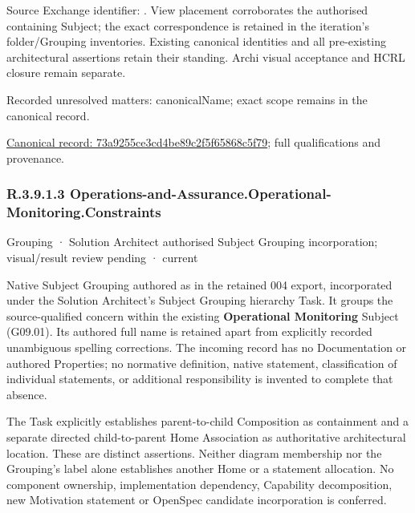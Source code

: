 Source Exchange identifier: \texttt{}. View placement corroborates
the authorised containing Subject; the exact correspondence is retained in the
iteration's folder/Grouping inventories. Existing canonical identities and all
pre-existing architectural assertions retain their standing. Archi visual
acceptance and HCRL closure remain separate.


{\small Recorded unresolved matters: canonicalName; exact scope remains in the canonical record.}\par
{\footnotesize \href{../../../../continuum/grouping/73a9255ce3cd4be89c2f5f65868c5f79.md}{Canonical record: 73a9255ce3cd4be89c2f5f65868c5f79}; full qualifications and provenance.}\par
\subsubsection*{R.3.9.1.3 Operations-and-Assurance.Operational-Monitoring.Constraints}
\label{navigation:R.3.9.1.3}

\label{element:b558d26d626b4276bd5ec38b8d42213a}
{\small Grouping · Solution Architect authorised Subject Grouping incorporation; visual/result review pending · current}\par

Native Subject Grouping authored as \texttt{} in the retained 004 export,
incorporated under the Solution Architect's Subject Grouping hierarchy Task.
It groups the source-qualified \texttt{} concern within
the existing \textbf{Operational Monitoring} Subject (G09.01). Its authored full name
is retained apart from explicitly recorded unambiguous spelling corrections.
The incoming record has no Documentation or authored Properties; no normative
definition, native statement, classification of individual statements, or
additional responsibility is invented to complete that absence.



The Task explicitly establishes parent-to-child Composition as containment and
a separate directed child-to-parent Home Association as authoritative architectural
location. These are distinct assertions. Neither diagram membership nor the
Grouping's label alone establishes another Home or a statement allocation.
No component ownership, implementation dependency, Capability decomposition,
new Motivation statement or OpenSpec candidate incorporation is conferred.



